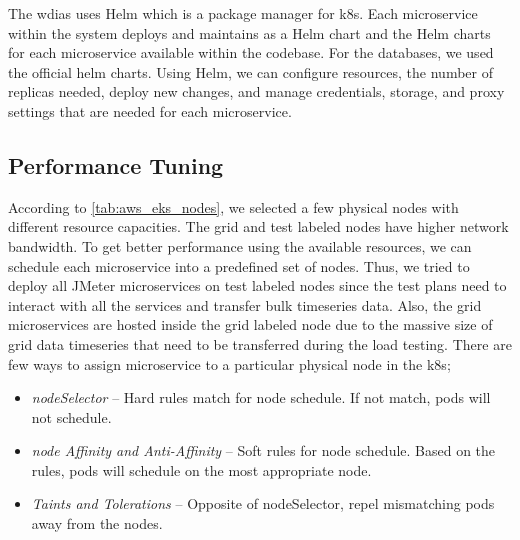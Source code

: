 The \acrshort{wdias} uses Helm \cite{CNCFHelmDocumentations} which is a package manager for \acrshort{k8s}. Each microservice within the system deploys and maintains as a Helm chart and the Helm charts \cite{KarunarathneHelmDeployments} for each microservice available within the codebase. For the databases, we used the official helm charts. Using Helm, we can configure resources, the number of replicas needed, deploy new changes, and manage credentials, storage, and proxy settings that are needed for each microservice.


\subsection{Performance Tuning}
\label{se:performance_tuning}
According to \cref{tab:aws_eks_nodes}, we selected a few physical nodes with different resource capacities. The grid and test labeled nodes have higher network bandwidth. To get better performance using the available resources, we can schedule each microservice into a predefined set of nodes. Thus, we tried to deploy all JMeter microservices on test labeled nodes since the test plans need to interact with all the services and transfer bulk timeseries data. Also, the grid microservices are hosted inside the grid labeled node due to the massive size of grid data timeseries that need to be transferred during the load testing. There are few ways to assign microservice to a particular physical node in the \acrshort{k8s};

\begin{itemize}
    \item \emph{nodeSelector} -- Hard rules match for node schedule. If not match, pods will not schedule.
    \item \emph{node Affinity and Anti-Affinity} -- Soft rules for node schedule. Based on the rules, pods will schedule on the most appropriate node.
    \item \emph{Taints and Tolerations} -- Opposite of nodeSelector, repel mismatching pods away from the nodes.
\end{itemize}

